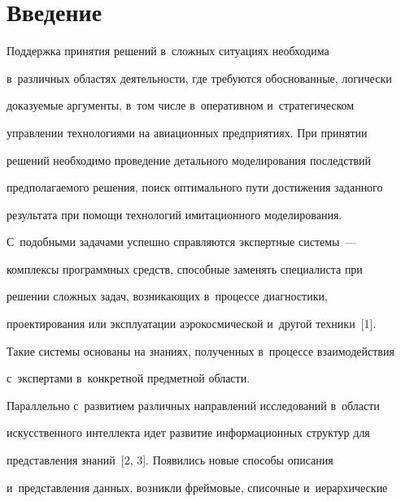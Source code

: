 


 \thispagestyle{headings}

 

 \vspace*{-16pt}

  

     \section{Введение}

     

     \vspace*{-2pt}

     

  Поддержка принятия решений в~сложных ситуациях необходима 

в~различных областях деятельности, где требуются обоснованные, логически 

доказуемые аргументы, в~том числе в~оперативном и~стратегическом 

управлении технологиями на авиационных предприятиях. При принятии 

решений необходимо проведение детального моделирования последствий 

предполагаемого решения, поиск оптимального пути достижения заданного 

результата при помощи технологий имитационного моделирования. 

С~подобными задачами успешно справляются экспертные системы~--- 

комплексы программных средств, способные заменять специалиста при 

решении сложных задач, возникающих в~процессе диагностики, 

проектирования или эксплуатации аэрокосмической и~другой техники~[1]. 

Такие системы основаны на знаниях, полученных в~процессе взаимодействия 

с~экспертами в~конкретной предметной об\-ласти.

  

  Параллельно с~развитием различных направлений исследований в~области 

искусственного интеллекта идет развитие информационных структур для 

представления знаний~[2, 3]. Появились новые способы описания 

и~представления данных, возникли фреймовые, списочные и~иерархические 

